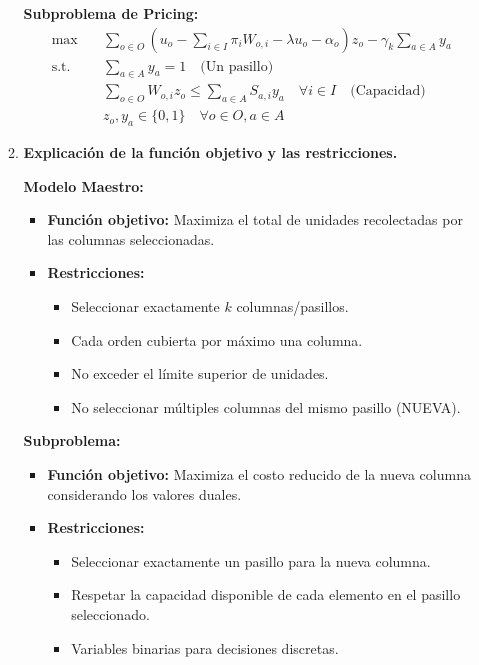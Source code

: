 \documentclass[a4paper,12pt]{article}
\begin{document}
\begin{enumerate}[label=(\alph*), leftmargin=2em]
\begin{enumerate}[label=\roman*., leftmargin=0.2em]
            \textbf{Subproblema de Pricing:}
            \[
            \begin{aligned}
            \max \quad & \sum_{o \in O} \left(u_o - \sum_{i \in I} \pi_i W_{o,i} - \lambda u_o - \alpha_o\right) z_o - \gamma_k \sum_{a \in A} y_a \\
            \text{s.t.} \quad
            & \sum_{a \in A} y_a = 1 \quad \text{(Un pasillo)} \\
            & \sum_{o \in O} W_{o,i} z_o \leq \sum_{a \in A} S_{a,i} y_a \quad \forall i \in I \quad \text{(Capacidad)} \\
            & z_o, y_a \in \{0,1\} \quad \forall o \in O, a \in A
            \end{aligned}
            \]

        \item \textbf{Explicación de la función objetivo y las restricciones.}

            \textbf{Modelo Maestro:}
            \begin{itemize}
                \item \textbf{Función objetivo:} Maximiza el total de unidades recolectadas por las columnas seleccionadas.
                \item \textbf{Restricciones:}
                \begin{itemize}
                    \item Seleccionar exactamente $k$ columnas/pasillos.
                    \item Cada orden cubierta por máximo una columna.
                    \item No exceder el límite superior de unidades.
                    \item No seleccionar múltiples columnas del mismo pasillo (NUEVA).
                \end{itemize}
            \end{itemize}

            \textbf{Subproblema:}
            \begin{itemize}
                \item \textbf{Función objetivo:} Maximiza el costo reducido de la nueva columna considerando los valores duales.
                \item \textbf{Restricciones:}
                \begin{itemize}
                    \item Seleccionar exactamente un pasillo para la nueva columna.
                    \item Respetar la capacidad disponible de cada elemento en el pasillo seleccionado.
                    \item Variables binarias para decisiones discretas.
                \end{itemize}
            \end{itemize}
    \end{enumerate}


\end{enumerate}
\end{document}
